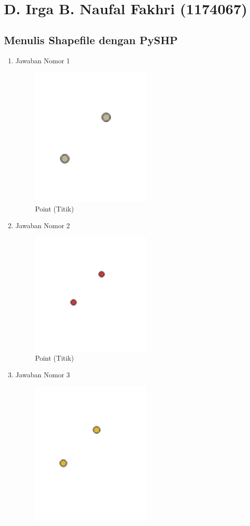 \section{D. Irga B. Naufal Fakhri (1174067)}
\subsection{Menulis Shapefile dengan PySHP}
\begin{enumerate}
	\item Jawaban Nomor 1
	
	\begin{figure}[H]
		\includegraphics[width=6cm]{figures/Tugas2/1174067/1.png}
		\centering
		\caption{Point (Titik)}
	\end{figure}
	\item Jawaban Nomor 2
	
	\begin{figure}[H]
		\includegraphics[width=6cm]{figures/Tugas2/1174067/2.png}
		\centering
		\caption{Point (Titik)}
	\end{figure}
	\item Jawaban Nomor 3
	
	\begin{figure}[H]
		\includegraphics[width=6cm]{figures/Tugas2/1174067/3.png}

\end{figure}
\end{enumerate}

